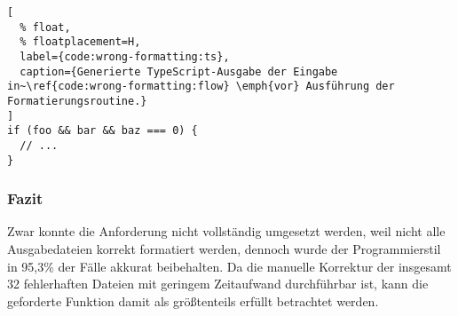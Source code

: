 \begin{lstlisting}[
  % float,
  % floatplacement=H,
  label={code:wrong-formatting:ts},
  caption={Generierte TypeScript-Ausgabe der Eingabe in~\ref{code:wrong-formatting:flow} \emph{vor} Ausführung der Formatierungsroutine.}
]
if (foo && bar && baz === 0) {
  // ...
}
\end{lstlisting}

\subsubsection{Fazit}

Zwar konnte die Anforderung nicht vollständig umgesetzt werden, weil nicht alle Ausgabedateien korrekt formatiert werden, dennoch wurde der Programmierstil in 95,3\% der Fälle akkurat beibehalten. Da die manuelle Korrektur der insgesamt 32 fehlerhaften Dateien mit geringem Zeitaufwand durchführbar ist, kann die geforderte Funktion damit als größtenteils erfüllt betrachtet werden.
